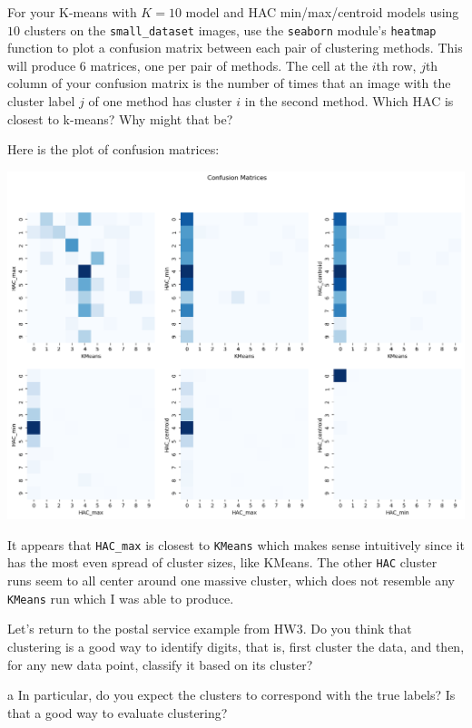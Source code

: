 \documentclass[expanded]{lkx_pset}
\begin{document}
\begin{parts}
	\begin{part}{6} For your K-means with $K = 10$ model and HAC min/max/centroid
		models using $10$ clusters on the \texttt{small\_dataset} images,
		use the \texttt{seaborn} module's \texttt{heatmap} function to plot
		a confusion matrix between each pair of clustering methods.  This
		will produce 6 matrices, one per pair of methods. The cell at the
		$i$th row, $j$th column of your confusion matrix is the number of
		times that an image with the cluster label $j$ of one method has
		cluster $i$ in the second method.  Which HAC is closest to k-means?
		Why might that be?
	\end{part}

	Here is the plot of confusion matrices:
	\begin{center}
		\includegraphics[scale = 0.5]{figures/confusion_matrices.png}
	\end{center}
	It appears that \texttt{HAC\_max} is closest to \texttt{KMeans} which makes sense intuitively since it has the most even spread of cluster sizes, like KMeans. The other \texttt{HAC} cluster runs seem to all center around one massive cluster, which does not resemble any \texttt{KMeans} run which I was able to produce.


	\begin{part}{7} Let's return to the postal service example from HW3.  Do you
		think that clustering is a good way to identify digits, that is,
		first cluster the data, and then, for any new data point, classify
		it based on its cluster?
	\end{part}
	\begin{parts}
		\begin{part}{a} In particular, do you expect the clusters to correspond with the true labels?  Is that a good way to evaluate clustering?
		\end{part}


\end{parts}
\end{parts}
\end{document}
